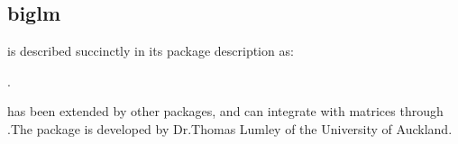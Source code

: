 \subsection{biglm}\label{subsec:biglm}

 is described succinctly in its package description as:

.

 has been extended by other packages, and can integrate with
 matrices through .The package is developed by Dr.Thomas Lumley of the University of Auckland.
